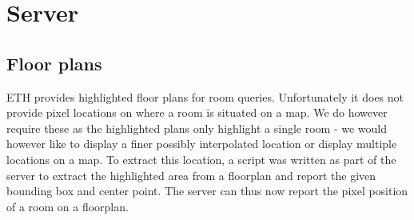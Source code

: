 \section{Server}

\subsection{Floor plans}
	ETH provides highlighted floor plans for room queries. Unfortunately it does not provide pixel locations on where a room is situated on a map. We do however require these as the highlighted plans only highlight a single room - we would however like to display a finer possibly interpolated location or display multiple locations on a map.
	To extract this location, a script was written as part of the server to extract the highlighted area from a floorplan and report the given bounding box and center point. The server can thus now report the pixel position of a room on a floorplan.

